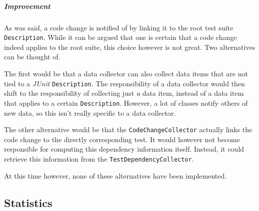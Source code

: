 \documentclass[i2]{oss}
\newcommand{\class}[1]{\texttt{#1}}
\newcommand{\junit}{\emph{JUnit }}
\begin{document}
\subparagraph{Improvement} 

As was said, a code change is notified of by linking it to the root test suite \class{Description}.
While it can be argued that one is certain that a code change indeed applies to the root suite, this choice however is not great.
Two alternatives can be thought of.

The first would be that a data collector can also collect data items that are not tied to a \junit \class{Description}.
The responsibility of a data collector would then shift to the responsibility of collecting just \emph{a} data item, instead of a data item that applies to a certain \class{Description}.
However, a lot of classes notify others of new data, so this isn't really specific to a data collector.

The other alternative would be that the \class{CodeChangeCollector} actually links the code change to the directly corresponding test.
It would however not become responsible for computing this dependency information itself.
Instead, it could retrieve this information from the \class{TestDependencyCollector}.

At this time however, none of these alternatives have been implemented.



\subsection{Statistics}
\label{subssec: statistics}


\end{document}
